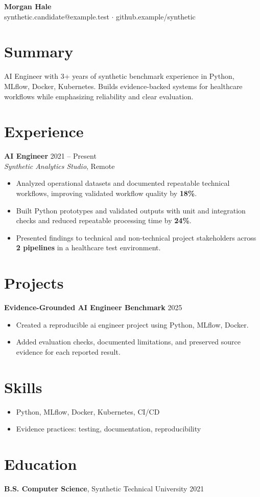 \documentclass[10pt,letterpaper]{article}
\newcommand{\resumeItem}[1]{\item #1}
\newcommand{\resumeItemListStart}{\begin{itemize}[leftmargin=*]}
\newcommand{\resumeItemListEnd}{\end{itemize}}
\begin{document}
\begin{center}
{\Large \textbf{Morgan Hale}}\\
synthetic.candidate@example.test $\cdot$ github.example/synthetic
\end{center}

\section*{Summary}
AI Engineer with 3+ years of synthetic benchmark experience in Python, MLflow, Docker, Kubernetes. Builds evidence-backed systems for healthcare workflows while emphasizing reliability and clear evaluation.

\section*{Experience}
\textbf{AI Engineer} \hfill 2021 -- Present\\
\textit{Synthetic Analytics Studio}, Remote
\resumeItemListStart
  \resumeItem{Analyzed operational datasets and documented repeatable technical workflows, improving validated workflow quality by \textbf{18\%}.}
  \resumeItem{Built Python prototypes and validated outputs with unit and integration checks and reduced repeatable processing time by \textbf{24\%}.}
  \resumeItem{Presented findings to technical and non-technical project stakeholders across \textbf{2 pipelines} in a healthcare test environment.}
\resumeItemListEnd

\section*{Projects}
\textbf{Evidence-Grounded AI Engineer Benchmark} \hfill 2025
\resumeItemListStart
  \resumeItem{Created a reproducible ai engineer project using Python, MLflow, Docker.}
  \resumeItem{Added evaluation checks, documented limitations, and preserved source evidence for each reported result.}
\resumeItemListEnd

\section*{Skills}
\resumeItemListStart
  \resumeItem{Python, MLflow, Docker, Kubernetes, CI/CD}
  \resumeItem{Evidence practices: testing, documentation, reproducibility}
\resumeItemListEnd

\section*{Education}
\textbf{B.S. Computer Science}, Synthetic Technical University \hfill 2021
\end{document}
